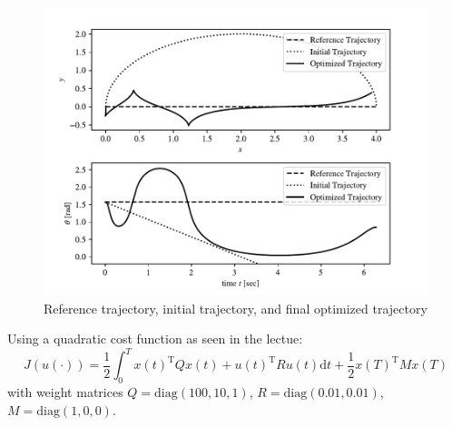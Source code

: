 \begin{figure}[h]
    \centering
    \includegraphics[width=\textwidth]{initial.pdf}
    \caption{Reference trajectory, initial trajectory, and final optimized trajectory}
\end{figure}
\clearpage
Using a quadratic cost function as seen in the lectue:
\begin{equation*}
    J(u(\cdot))=\frac{1}{2} \int_0^T x(t)^{\mathrm{T}} Q x(t)+u(t)^{\mathrm{T}} R u(t) \mathrm{d} t+\frac{1}{2} x(T)^{\mathrm{T}} M x(T)
    \end{equation*}
with weight matrices $Q=\textrm{diag}(100,10,1)$, $R=\textrm{diag}(0.01,0.01)$, $M=\textrm{diag}(1,0,0)$.

